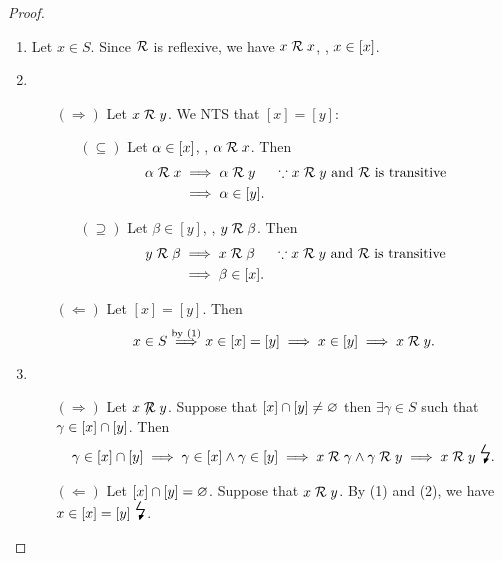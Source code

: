 \documentclass[11pt,openany]{article}
\begin{document}
\begin{proof}
	\begin{enumerate}[(1)]
		\item Let $x\in S$. Since $\mathcal{R}$ is reflexive, we have $x\mathrel{\mathcal{R}} x$, \ie, $x\in\left[x\right]$.
		\item \begin{itemize}
			\item[$(\Rightarrow)$] Let $x\mathrel{\mathcal{R}} y$. We NTS that $[x]=[y]$: \begin{itemize}
				\item[$(\subseteq)$] Let $\alpha\in\left[x\right]$, \ie, $\alpha\mathrel{\mathcal{R}} x$. Then 
				\begin{align*}
					\alpha\mathrel{\mathcal{R}} x&\implies \alpha\mathrel{\mathcal{R}} y&\because\text{$x\mathrel{\mathcal{R}} y$ and $\mathcal{R}$ is transitive} \\
					&\implies \alpha\in[y].
				\end{align*}
				\item[$(\supseteq)$] Let $\beta\in[y]$, \ie, $y\mathrel{\mathcal{R}}\beta$. Then 
				\begin{align*}
					y\mathrel{\mathcal{R}}\beta&\implies x\mathrel{\mathcal{R}} \beta&\because\text{$x\mathrel{\mathcal{R}} y$ and $\mathcal{R}$ is transitive} \\
					&\implies \beta\in[x].
				\end{align*}
			\end{itemize}
			\item[$(\Leftarrow)$] Let $[x]=[y]$. Then \[
			x\in S\overset{\text{by (1)}}{\implies} x\in[x]=[y]\implies x\in[y]\implies x\mathrel{\mathcal{R}} y.
			\]
		\end{itemize}
		\item \begin{itemize}
			\item[$(\Rightarrow)$] Let $x\centernot\relation y$. Suppose that $\left[x\right]\cap[y]\neq\varnothing$ then $\exists \gamma\in S$ such that $\gamma\in\left[x\right]\cap[y]$. Then \begin{align*}
				\gamma\in [x]\cap [y]\implies \gamma\in [x]\land\gamma\in [y]\implies x\relation\gamma\land \gamma\relation y\implies x\relation y\ \text{\LARGE\lightning}.
			\end{align*}
			\item[$(\Leftarrow)$] Let $\left[x\right]\cap[y]=\varnothing$. Suppose that $x\mathrel{\mathcal{R}} y$. By (1) and (2), we have $x\in[x]=[y]\ \text{\LARGE\lightning}$.
		\end{itemize}
	\end{enumerate}
\end{proof}
\end{document}
